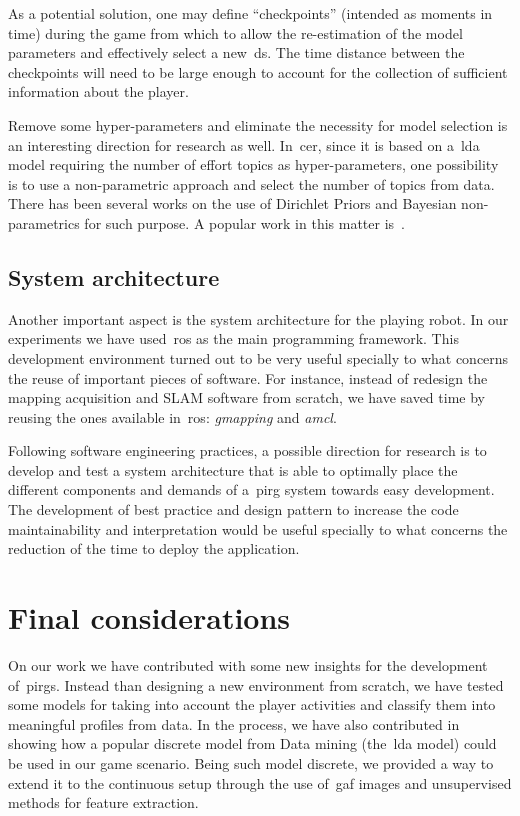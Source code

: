 As a potential solution, one may define ``checkpoints'' (intended as moments in time) during the game from which to allow the re-estimation of the model parameters and effectively select a new~\gls{ds}. The time distance between the checkpoints will need to be large enough to account for the collection of sufficient information about the player.

Remove some hyper-parameters and eliminate the necessity for model selection is an interesting direction for research as well. In~\gls{cer}, since it is based on a~\gls{lda} model requiring the number of effort topics as hyper-parameters, one possibility is to use a non-parametric approach and select the number of topics from data. There has been several works on the use of Dirichlet Priors and Bayesian non-parametrics for such purpose. A popular work in this matter is~\cite{teh_sharing_2005}. 

\subsection{System architecture}
Another important aspect is the system architecture for the playing robot. In our experiments we have used~\gls{ros} as the main programming framework. This development environment turned out to be very useful specially to what concerns the reuse of important pieces of software. For instance, instead of redesign the  mapping acquisition and SLAM software from scratch, we have saved time by reusing the ones available in~\gls{ros}: \textit{gmapping} and \textit{amcl}. 

Following software engineering practices, a possible direction for research is to develop and test a system architecture that is able to optimally place the different components and demands of a~\gls{pirg} system towards easy development. The development of best practice and design pattern to increase the code maintainability and interpretation would be useful specially to what concerns the reduction of the time to deploy the application.

\section{Final considerations}
On our work we have contributed with some new insights for the development of~\gls{pirg}s. Instead than designing a new environment from scratch, %
we have tested some models for taking into account the player activities and classify them into meaningful profiles from data. In the process, we have also contributed in showing how a popular discrete model from Data mining (the~\gls{lda} model) could be used in our game scenario. Being such model discrete, we provided a way to extend it to the continuous setup through the use of~\gls{gaf} images and unsupervised methods for feature extraction.

